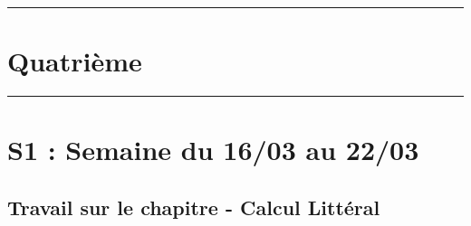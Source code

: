 \documentclass[11pt]{article}
\newcommand{\horrule}[1]{\rule{\linewidth}{#1}} %
\begin{document}

\newtheorem{Definition}{Définition}
\newtheorem{Theorem}{Théorème}
\newtheorem{Proposition}{Propriété}

\renewcommand{\labelitemi}{$\bullet$}
\renewcommand{\labelitemii}{$\circ$}

\setlength{\columnseprule}{1pt}

\horrule{2px}
\section*{Quatrième}
\horrule{2px}

\section{S1 : Semaine du 16/03 au 22/03}

\subsection{Travail sur le chapitre - Calcul Littéral}
\end{document}
